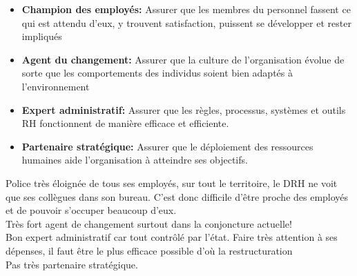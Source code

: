 \documentclass[12pt]{article}
\begin{document}
\begin{itemize}
	\item \textbf{Champion des employés:} Assurer que les membres du personnel fassent ce qui est attendu d'eux, y trouvent satisfaction, puissent se développer et rester impliqués 
	\item \textbf{Agent du changement:} Assurer que la culture de l'organisation évolue de sorte que les comportements des individus soient bien adaptés à l'environnement 
	\item \textbf{Expert administratif:} Assurer que les règles, processus, systèmes et outils RH fonctionnent de manière efficace et efficiente.
	\item \textbf{Partenaire stratégique:} Assurer que le déploiement des ressources humaines aide l'organisation à atteindre ses objectifs.
\end{itemize}


Police très éloignée de tous ses employés, sur tout le territoire, le DRH ne voit que ses collègues dans son bureau. C'est donc difficile d'être proche des employés et de pouvoir s'occuper beaucoup d'eux.\\

Très fort agent de changement surtout dans la conjoncture actuelle!\\

Bon expert administratif car tout contrôlé par l'état. Faire très attention à ses dépenses, il faut être le plus efficace possible d'où la restructuration\\


Pas très partenaire stratégique. 

\end{document}
